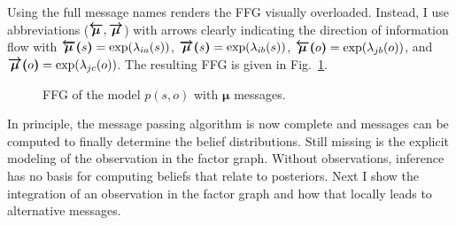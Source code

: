 Using the full message names renders the FFG visually overloaded.
Instead, I use abbreviations (\(\textcolor{black}{\bm{\overleftarrow{\mu}}},\textcolor{black}{\bm{\overrightarrow{\mu}}}\)) with arrows clearly indicating the direction of information flow with \(\textcolor{black}{\bm{\overleftarrow{\mu}(}s\bm{)}} = \exp(\lambda_{ia}(s))\), \(\textcolor{black}{\bm{\overrightarrow{\mu}(}s\bm{)}} = \exp(\lambda_{ib}(s))\), \(\textcolor{black}{\bm{\overleftarrow{\mu}(}o\bm{)}} = \exp(\lambda_{jb}(o))\), and \(\textcolor{black}{\bm{\overrightarrow{\mu}(}o\bm{)}} = \exp(\lambda_{jc}(o))\).
The resulting FFG is given in Fig.~\ref{fig:7}.
\begin{figure}[htbp]
    \centering


    \caption{FFG of the model \(p(s,o)\) with \(\bm{\mu}\) messages.}
    \label{fig:7}
\end{figure}

In principle, the message passing algorithm is now complete and messages can be computed to finally determine the belief distributions. Still missing is the explicit modeling of the observation in the factor graph. Without observations, inference has no basis for computing beliefs that relate to posteriors. Next I show the integration of an observation in the factor graph and how that locally leads to alternative messages.

